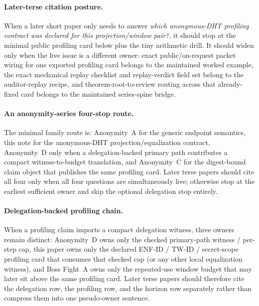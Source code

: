 \documentclass[11pt]{article}
\begin{document}
\paragraph{Later-terse citation posture.}
When a later short paper only needs to answer \emph{which anonymous-DHT profiling contract was declared for this projection/window pair?}, it should stop at the minimal public profiling card below plus the tiny arithmetic drill.
It should widen only when the live issue is a different owner: exact public/on-request packet wiring for one exported profiling card belongs to the maintained worked example, the exact mechanical replay checklist and replay-verdict field set belong to the auditor-replay recipe, and theorem-root-to-review routing across that already-fixed card belongs to the maintained series-spine bridge.\cite{series:workedexample,series:replayrecipe,series:seriesspines}

\paragraph{An anonymity-series four-stop route.}
The minimal family route is: Anonymity~A for the generic endpoint semantics, this note for the anonymous-DHT projection/equalization contract, Anonymity~D only when a delegation-backed primary path contributes a compact witness-to-budget translation, and Anonymity~C for the digest-bound claim object that publishes the same profiling card. Later terse papers should cite all four only when all four questions are simultaneously live; otherwise stop at the earliest sufficient owner and skip the optional delegation stop entirely.\cite{series:oddsinflation,series:spectral2budget,series:abomoinl}

\paragraph{Delegation-backed profiling chain.}
When a profiling claim imports a compact delegation witness, three owners remain distinct: Anonymity~D owns only the checked primary-path witness / per-step cap, this paper owns only the declared ENF-ID / TW-ID / secret-scope profiling card that consumes that checked cap (or any other local equalization witness), and Boss Fight~A owns only the repeated-use window budget that may later sit above the same profiling card. Later terse papers should therefore cite the delegation row, the profiling row, and the horizon row separately rather than compress them into one pseudo-owner sentence.\cite{series:spectral2budget,series:bossfightA}
\end{document}
